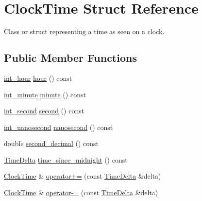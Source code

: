 \hypertarget{structClockTime}{\section{\-Clock\-Time \-Struct \-Reference}
\label{structClockTime}
}


\-Class or struct representing a time as seen on a clock.  


\subsection*{\-Public \-Member \-Functions}
\begin{DoxyCompactItemize}
\item 
\hyperlink{types_8h_a62ed583cd6a13da9650111e3b4b4eedc}{int\-\_\-hour} \hyperlink{structClockTime_a46aca2fc3ed57f80398729383d7b81d3}{hour} () const 
\item 
\hyperlink{types_8h_a3e55debfc84cabacf28bddf2d04984c9}{int\-\_\-minute} \hyperlink{structClockTime_a812681b81ece92f27756f0618e56f37b}{minute} () const 
\item 
\hyperlink{types_8h_abd3494f4b69b446ec1fc0477a8b769c9}{int\-\_\-second} \hyperlink{structClockTime_a568f139cb2e19fca3e2ae2acdf47787f}{second} () const 
\item 
\hyperlink{types_8h_a153ef9bf3a8448179ab1d606f5593b4c}{int\-\_\-nanosecond} \hyperlink{structClockTime_abba9faf8356211d4dc830ca3b3d38f18}{nanosecond} () const 
\item 
double \hyperlink{structClockTime_a2a7cf03e7f0bca581a82333d2d8123da}{second\-\_\-decimal} () const 
\item 
\hyperlink{structTimeDelta}{\-Time\-Delta} \hyperlink{structClockTime_a9c6423703cb0026435fb6e5b2d261d54}{time\-\_\-since\-\_\-midnight} () const 
\item 
\hyperlink{structClockTime}{\-Clock\-Time} \& \hyperlink{structClockTime_a8a98c385f805022b1bc229e472e8c1e9}{operator+=} (const \hyperlink{structTimeDelta}{\-Time\-Delta} \&delta)
\item 
\hyperlink{structClockTime}{\-Clock\-Time} \& \hyperlink{structClockTime_a50a16387217243bc8986735c7cebd012}{operator-\/=} (const \hyperlink{structTimeDelta}{\-Time\-Delta} \&delta)
\end{DoxyCompactItemize}
